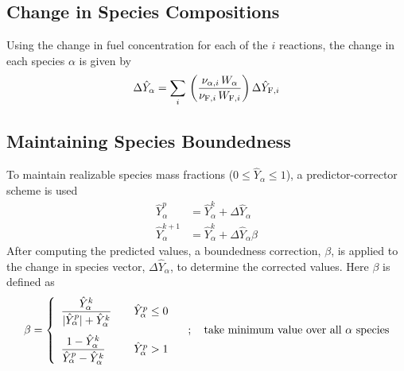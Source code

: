 \subsection{Change in Species Compositions}

Using the change in fuel concentration for each of the $i$ reactions, the change in each species $\alpha$ is given by
\begin{equation}\label{eq:change_alpha}
\Delta \hat{Y}_{\alpha} = \sum_i \,\left(\frac{\nu_{\alpha,i} \,W_{\alpha}}{\nu_{{\rm F},i} \,W_{{\rm F},i}}\right)\Delta \hat{Y}_{{\rm F},i}
\end{equation}

\subsection{Maintaining Species Boundedness}
\label{boundedness}

To maintain realizable species mass fractions ($ 0 \leq \hat{Y}_{\alpha} \leq 1$), a predictor-corrector scheme is used
\begin{align}
\hat{Y}_\alpha^p &= \hat{Y}_\alpha^k + \Delta \hat{Y}_\alpha \label{eq:bc_predict} \\
\hat{Y}_\alpha^{k+1} &= \hat{Y}_\alpha^k + \Delta \hat{Y}_\alpha \beta \label{eq:bc_correct}
\end{align}
After computing the predicted values, a boundedness correction, $\beta$, is applied to the change in species vector, $\Delta \hat{Y}_{\alpha}$, to determine the corrected values. Here $\beta$ is defined as
\begin{equation} \label{eq:bc_beta}
\beta = \left\{ \begin{array}{ll} \displaystyle
          \displaystyle \frac{\hat{Y}_{\alpha}^k}{\lvert \hat{Y}_{\alpha}^p\rvert + \hat{Y}_{\alpha}^k}  & \quad {\hat{Y}_\alpha^p \le 0} \\ [0.2in]
          \displaystyle \frac{1-\hat{Y}_{\alpha}^k}{\hat{Y}_{\alpha}^p - \hat{Y}_{\alpha}^k}  & \quad {\hat{Y}_\alpha^p > 1} \end{array}\right. \quad ; \quad \mbox{take minimum value over all $\alpha$ species}
\end{equation}

